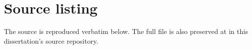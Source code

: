 \section*{Source listing}

The source is reproduced verbatim below. The full file is also preserved at  in this dissertation's source repository.


